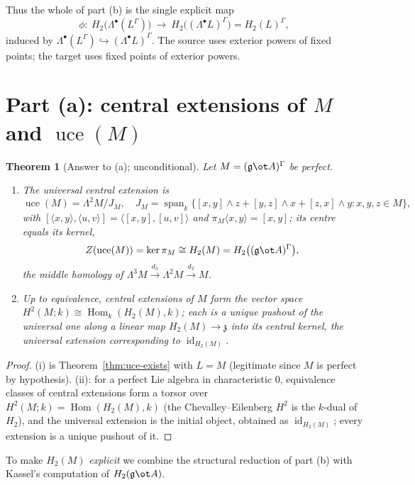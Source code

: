 \documentclass{amsart}
\newtheorem{theorem}{Theorem}
\theoremstyle{definition}
\DeclareMathOperator{\uce}{uce}
\DeclareMathOperator{\Hom}{Hom}
\DeclareMathOperator{\id}{id}
\newcommand{\g}{\mathfrak{g}}
\newcommand{\Gm}{\Gamma}
\newcommand{\ra}{\rightarrow}
\begin{document}
Thus the whole of part (b) is the single explicit map
\begin{equation}\label{eq:phi}
   \phi\colon\ H_2\bigl(\Lambda^\bullet(L^{\Gm})\bigr)\ \longrightarrow\
   H_2\bigl((\Lambda^\bullet L)^{\Gm}\bigr)=H_2(L)^{\Gm},
\end{equation}
induced by $\Lambda^\bullet(L^{\Gm})\hookrightarrow(\Lambda^\bullet L)^{\Gm}$.
The source uses exterior powers of fixed points; the target uses fixed points of
exterior powers.

\section{Part (a): central extensions of $M$ and $\uce(M)$}

\begin{theorem}[Answer to (a); unconditional]\label{thm:partA}
Let $M=(\g\ot A)^{\Gm}$ be perfect.
\begin{enumerate}
\item[(i)] The universal central extension is
\[
   \uce(M)=\Lambda^2M/J_M,\quad
   J_M=\operatorname{span}_k\{[x,y]\wedge z+[y,z]\wedge x+[z,x]\wedge y:x,y,z\in M\},
\]
with $[\langle x,y\rangle,\langle u,v\rangle]=\langle[x,y],[u,v]\rangle$ and
$\pi_M\langle x,y\rangle=[x,y]$; its centre equals its kernel,
\[
   Z(\uce(M))=\ker\pi_M\cong H_2(M)=H_2\bigl((\g\ot A)^{\Gm}\bigr),
\]
the middle homology of $\Lambda^3M\xrightarrow{d_3}\Lambda^2M\xrightarrow{d_2}M$.
\item[(ii)] Up to equivalence, central extensions of $M$ form the vector space
$H^2(M;k)\cong\Hom_k(H_2(M),k)$; each is a unique pushout of the universal one
along a linear map $H_2(M)\ra\mathfrak z$ into its central kernel, the universal
extension corresponding to $\id_{H_2(M)}$.
\end{enumerate}
\end{theorem}
\begin{proof}
(i) is Theorem~\ref{thm:uce-exists} with $L=M$ (legitimate since $M$ is perfect by
hypothesis).  (ii): for a perfect Lie algebra in characteristic $0$, equivalence
classes of central extensions form a torsor over $H^2(M;k)=\Hom(H_2(M),k)$ (the
Chevalley--Eilenberg $H^2$ is the $k$-dual of $H_2$), and the universal extension
is the initial object, obtained as $\id_{H_2(M)}$; every extension is a unique
pushout of it.
\end{proof}

To make $H_2(M)$ \emph{explicit} we combine the structural reduction of part (b)
with Kassel's computation of $H_2(\g\ot A)$.
\end{document}
